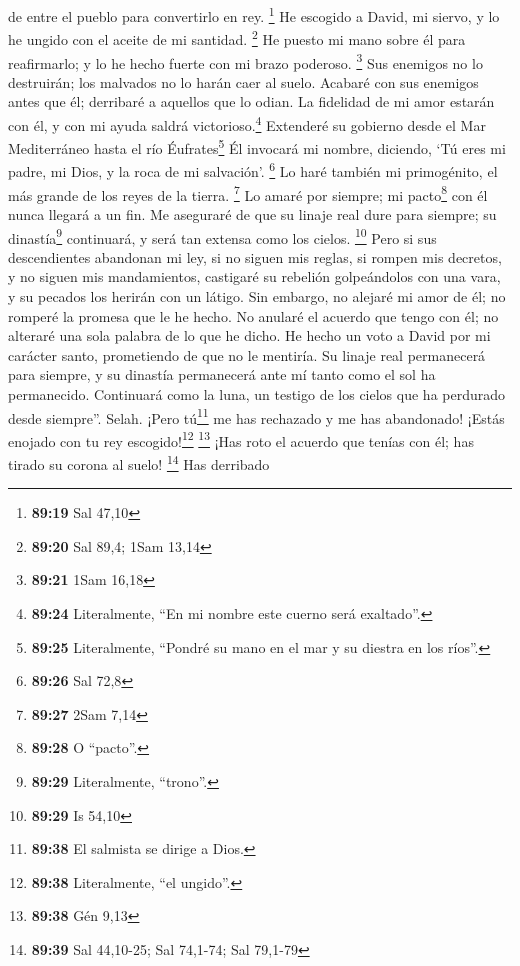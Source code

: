 de entre el pueblo para convertirlo en rey. \footnote{\textbf{89:19} Sal
  47,10}  He escogido a David, mi siervo, y lo he ungido
con el aceite de mi santidad. \footnote{\textbf{89:20} Sal 89,4; 1Sam
  13,14}  He puesto mi mano sobre él para reafirmarlo; y
lo he hecho fuerte con mi brazo poderoso. \footnote{\textbf{89:21} 1Sam
  16,18}  Sus enemigos no lo destruirán; los malvados no
lo harán caer al suelo.  Acabaré con sus enemigos antes
que él; derribaré a aquellos que lo odian.  La fidelidad
de mi amor estarán con él, y con mi ayuda saldrá victorioso.\footnote{\textbf{89:24}
  Literalmente, ``En mi nombre este cuerno será exaltado''.}
 Extenderé su gobierno desde el Mar Mediterráneo hasta el
río Éufrates\footnote{\textbf{89:25} Literalmente, ``Pondré su mano en
  el mar y su diestra en los ríos''.}  Él invocará mi
nombre, diciendo, `Tú eres mi padre, mi Dios, y la roca de mi
salvación'. \footnote{\textbf{89:26} Sal 72,8}  Lo haré
también mi primogénito, el más grande de los reyes de la tierra.
\footnote{\textbf{89:27} 2Sam 7,14}  Lo amaré por
siempre; mi pacto\footnote{\textbf{89:28} O ``pacto''.} con él nunca
llegará a un fin.  Me aseguraré de que su linaje real
dure para siempre; su dinastía\footnote{\textbf{89:29} Literalmente,
  ``trono''.} continuará, y será tan extensa como los cielos.
\footnote{\textbf{89:29} Is 54,10}  Pero si sus
descendientes abandonan mi ley, si no siguen mis reglas, 
si rompen mis decretos, y no siguen mis mandamientos, 
castigaré su rebelión golpeándolos con una vara, y su pecados los
herirán con un látigo.  Sin embargo, no alejaré mi amor
de él; no romperé la promesa que le he hecho.  No anularé
el acuerdo que tengo con él; no alteraré una sola palabra de lo que he
dicho.  He hecho un voto a David por mi carácter santo,
prometiendo de que no le mentiría.  Su linaje real
permanecerá para siempre, y su dinastía permanecerá ante mí tanto como
el sol ha permanecido.  Continuará como la luna, un
testigo de los cielos que ha perdurado desde siempre''. Selah.
 ¡Pero tú\footnote{\textbf{89:38} El salmista se dirige a
  Dios.} me has rechazado y me has abandonado! ¡Estás enojado con tu rey
escogido!\footnote{\textbf{89:38} Literalmente, ``el ungido''.}
\footnote{\textbf{89:38} Gén 9,13}  ¡Has roto el acuerdo
que tenías con él; has tirado su corona al suelo! \footnote{\textbf{89:39}
  Sal 44,10-25; Sal 74,1-74; Sal 79,1-79}  Has derribado
